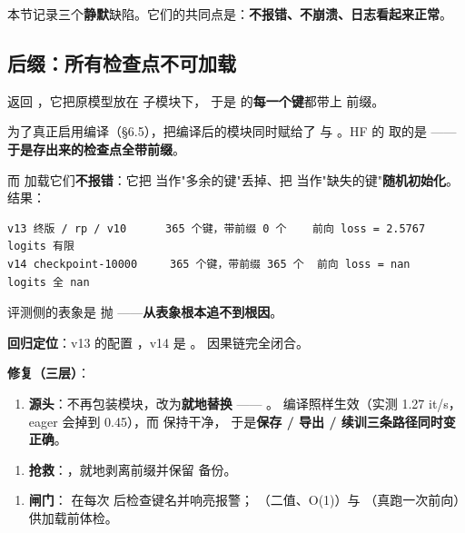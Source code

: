 \documentclass[11pt,openany]{ctexart}
\begin{document}
本节记录三个\textbf{静默}缺陷。它们的共同点是：\textbf{不报错、不崩溃、日志看起来正常}。

\subsection{ 后缀：所有检查点不可加载}

 返回 ，它把原模型放在  子模块下， 于是  的\textbf{每一个键}都带上  前缀。

 为了真正启用编译（§6.5），把编译后的模块同时赋给了  与 。HF 的  取的是 ——\textbf{于是存出来的检查点全带前缀}。

而  加载它们\textbf{不报错}：它把  当作"多余的键"丢掉、把  当作"缺失的键"\textbf{随机初始化}。结果：

\begin{lstlisting}[]
v13 终版 / rp / v10      365 个键，带前缀 0 个    前向 loss = 2.5767   logits 有限
v14 checkpoint-10000     365 个键，带前缀 365 个  前向 loss = nan      logits 全 nan
\end{lstlisting}

评测侧的表象是  抛 ——\textbf{从表象根本追不到根因}。

\textbf{回归定位}：v13 的配置 ，v14 是 。 因果链完全闭合。

\textbf{修复（三层）}：

\begin{enumerate}
  \item \textbf{源头}：不再包装模块，改为\textbf{就地替换 }—— 。 编译照样生效（实测 1.27 it/s，eager 会掉到 0.45），而  保持干净， 于是\textbf{保存 / 导出 / 续训三条路径同时变正确}。
\end{enumerate}
\begin{enumerate}
  \item \textbf{抢救}：，就地剥离前缀并保留  备份。
\end{enumerate}
\begin{enumerate}
  \item \textbf{闸门}： 在每次  后检查键名并响亮报警； （二值、O(1)）与 （真跑一次前向）供加载前体检。
\end{enumerate}
\end{document}
